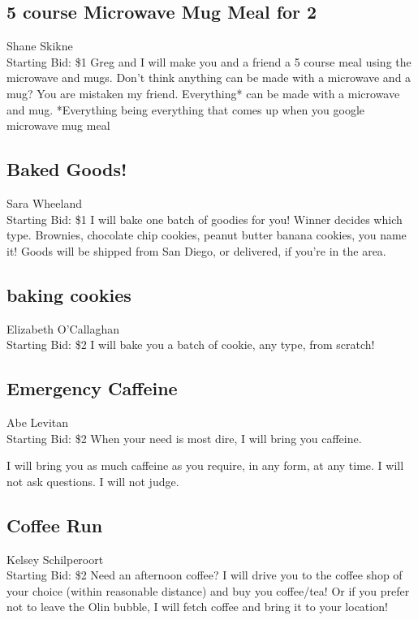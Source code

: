 \documentclass[11pt]{article}
\begin{document}
\subsection{5 course Microwave Mug Meal for 2}
Shane Skikne
\\
Starting Bid: \$1
\newline
Greg and I will make you and a friend a 5 course meal using the microwave and mugs. Don't think anything can be made with a microwave and a mug? You are mistaken my friend. Everything* can be made with a microwave and mug.  
*Everything being everything that comes up when you google microwave mug meal
\subsection{Baked Goods!}
Sara Wheeland
\\
Starting Bid: \$1
\newline
I will bake one batch of goodies for you!  Winner decides which type.  Brownies, chocolate chip cookies, peanut butter banana cookies, you name it!  Goods will be shipped from San Diego, or delivered, if you're in the area.
\subsection{baking cookies}
Elizabeth O'Callaghan
\\
Starting Bid: \$2
\newline
I will bake you a batch of cookie, any type, from scratch!
\subsection{Emergency Caffeine}
Abe Levitan
\\
Starting Bid: \$2
\newline
When your need is most dire, I will bring you caffeine.

I will bring you as much caffeine as you require, in any form, at any time. I will not ask questions. I will not judge.
\subsection{Coffee Run}
Kelsey Schilperoort
\\
Starting Bid: \$2
\newline
Need an afternoon coffee? I will drive you to the coffee shop of your choice (within reasonable distance) and buy you coffee/tea! Or if you prefer not to leave the Olin bubble, I will fetch coffee and bring it to your location! 
\end{document}
